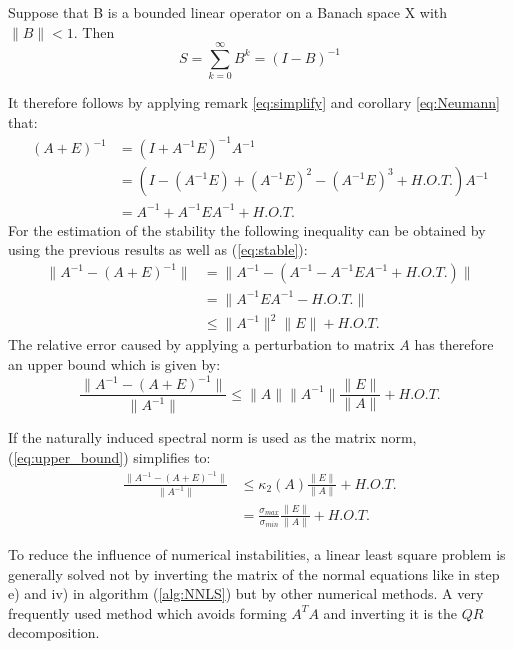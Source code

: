 \begin{corollary}\label{eq:Neumann}
	Suppose that B is a bounded linear operator on a Banach space X with $\lVert B \rVert < 1$. Then	
	\begin{equation}
		S = \sum_{k=0}^\infty B^k = (I-B)^{-1}
	\end{equation}  
\end{corollary}
It therefore follows by applying remark \ref{eq:simplify} and corollary \ref{eq:Neumann} that:
\begin{align*}
	(A + E)^{-1} 	&= (I + A^{-1}E)^{-1}A^{-1} \\
					&= (I - (A^{-1}E) + (A^{-1}E)^2 - (A^{-1}E)^3 + H.O.T.) A^{-1} \\
					&= A^{-1} + A^{-1} E A^{-1} + H.O.T.
\end{align*}
 For the estimation of the stability the following inequality can be obtained by using the previous results as well as (\ref{eq:stable}):
\begin{align*}
	\lVert A^{-1} - (A + E)^{-1} \rVert & = \lVert A^{-1} - (A^{-1} - A^{-1}EA^{-1} + H.O.T.) \rVert \\
		& = \lVert A^{-1}EA^{-1} - H.O.T. \rVert \\
		& \leq \lVert A^{-1} \rVert^2 \lVert E \rVert +  H.O.T.
\end{align*}
The relative error caused by applying a perturbation to matrix $A$ has therefore an upper bound which is given by: 
\begin{equation}\label{eq:upper_bound}
 \frac{\lVert A^{-1} - (A + E)^{-1} \rVert}{\lVert A^{-1}\rVert} \leq \lVert A \rVert \lVert A^{-1} \rVert \frac{\lVert E \rVert}{\lVert A \rVert} + H.O.T.
\end{equation}

\begin{remark}
	If the naturally induced spectral norm is used as the matrix norm, (\ref{eq:upper_bound}) simplifies to:
	\begin{align*}
		\frac{\lVert A^{-1} - (A + E)^{-1} \rVert}{\lVert A^{-1}\rVert} & \leq \kappa_2(A) \frac{\lVert E \rVert}{\lVert A \rVert} + H.O.T. \\
		& = \frac{\sigma_{max}}{\sigma_{min}} \frac{\lVert E \rVert}{\lVert A \rVert} + H.O.T.
	\end{align*}
\end{remark}


To reduce the influence of numerical instabilities, a linear least square problem is generally solved not by inverting the matrix of the normal equations like in step e) and iv) in algorithm (\ref{alg:NNLS}) but by other numerical methods. A very frequently used method which avoids forming $A^TA$ and inverting it is the $QR$ decomposition.  

